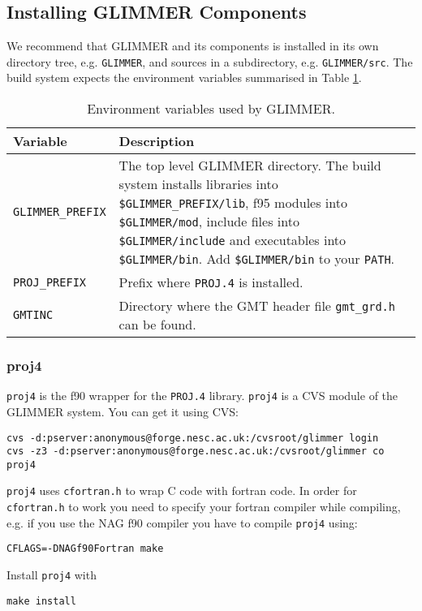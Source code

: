 \subsection{Installing GLIMMER Components}
We recommend that GLIMMER and its components is installed in its own directory tree, e.g. \texttt{GLIMMER}, and sources in a subdirectory, e.g. \texttt{GLIMMER/src}. The build system expects the environment variables summarised in Table \ref{ug.tab.env}.

\begin{table}[htbp]
  \centering
  \begin{tabular}{|l|p{10cm}|}
    \hline
    Variable & Description \\
    \hline
    \hline
    \texttt{GLIMMER\_PREFIX} & The top level GLIMMER directory. The build system installs libraries into \texttt{\$GLIMMER\_PREFIX/lib}, f95 modules into \texttt{\$GLIMMER/mod}, include files into \texttt{\$GLIMMER/include} and executables into \texttt{\$GLIMMER/bin}. Add \texttt{\$GLIMMER/bin} to your \texttt{PATH}.\\
    \hline
    \texttt{PROJ\_PREFIX} & Prefix where \texttt{PROJ.4} is installed. \\
    \hline
    \texttt{GMTINC} & Directory where the GMT header file \texttt{gmt\_grd.h} can be found.\\
    \hline
  \end{tabular}
  \caption{Environment variables used by GLIMMER.}
  \label{ug.tab.env}
\end{table}

\subsubsection{proj4}
\texttt{proj4} is the f90 wrapper for the \texttt{PROJ.4} library. \texttt{proj4} is a CVS module of the GLIMMER system. You can get it using CVS:
{\small
\begin{verbatim}
cvs -d:pserver:anonymous@forge.nesc.ac.uk:/cvsroot/glimmer login
cvs -z3 -d:pserver:anonymous@forge.nesc.ac.uk:/cvsroot/glimmer co proj4
\end{verbatim}}

\texttt{proj4} uses \texttt{cfortran.h} to wrap C code with fortran code. In order for \texttt{cfortran.h} to work you need to specify your fortran compiler while compiling, e.g. if you use the NAG f90 compiler you have to compile \texttt{proj4} using:
{\small
\begin{verbatim}
CFLAGS=-DNAGf90Fortran make
\end{verbatim}}
Install \texttt{proj4} with
{\small
\begin{verbatim}
make install
\end{verbatim}}

